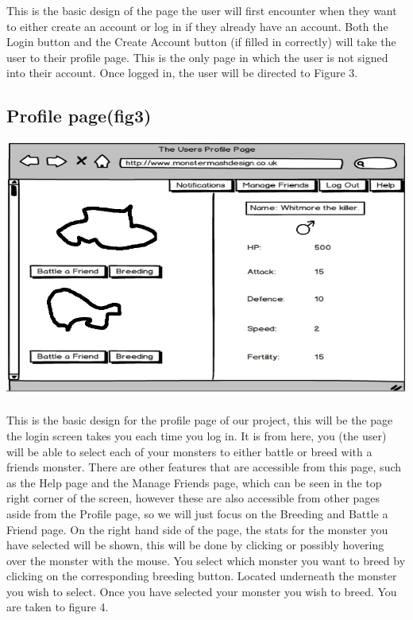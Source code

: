 \documentclass{project}
\begin{document}
This is the basic design of the page the user will first encounter when they want to
either create an account or log in if they already have an account. Both the Login
button and the Create Account button (if filled in correctly) will take the user to
their profile page. This is the only page in which the user is not signed into their
account.
Once logged in, the user will be directed to Figure 3.
\newpage


\subsection{Profile page(fig3)}
\includegraphics[scale=0.5]{userProfile.jpg}
\\
\\
This is the basic design for the profile page of our project, this will be the page
the login screen takes you each time you log in. It is from here, you (the user)
will be able to select each of your monsters to either battle or breed with a friends
monster. There are other features that are accessible from this page, such as the
Help page and the Manage Friends page, which can be seen in the top right corner of
the screen, however these are also accessible from other pages aside from the Profile
page, so we will just focus on the Breeding and Battle a Friend page.
On the right hand side of the page, the stats for the monster you have selected
will be shown, this will be done by clicking or possibly hovering over the monster
with the mouse.
You select which monster you want to breed by clicking on the corresponding
breeding button. Located underneath the monster you wish to select. Once you
have selected your monster you wish to breed. You are taken to figure 4.
\newpage
\end{document}
